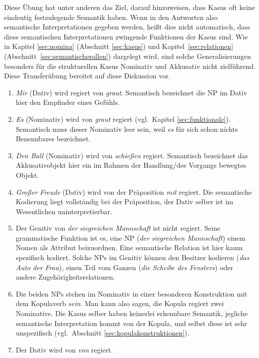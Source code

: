 Diese Übung hat unter anderen das Ziel, darauf hinzuweisen, dass Kasus oft keine eindeutig festzulegende Semantik haben.
Wenn in den Antworten also semantische Interpretationen gegeben werden, heißt dies nicht automatisch, dass diese semantischen Interpretationen zwingende Funktionen der Kasus sind.
Wie in Kapitel \ref{sec:nomina} (Abschnitt \ref{sec:kasus}) und Kapitel~\ref{sec:relationen} (Abschnitt~\ref{sec:semantischerollen}) dargelegt wird, sind solche Generalisierungen besonders für die strukturellen Kasus Nominativ und Akkusativ nicht zielführend.
Diese Transferübung bereitet auf diese Diskussion vor.

\begin{enumerate}\Lf
  \item \textit{Mir} (Dativ) wird regiert von \textit{graut}.
    Semantisch bezeichnet die NP im Dativ hier den Empfinder eines Gefühls.
  \item \textit{Es} (Nominativ) wird von \textit{graut} regiert (vgl.\ Kapitel \ref{sec:funktionale}).
    Semantisch muss dieser Nominativ leer sein, weil \textit{es} für sich schon nichts Benennbares bezeichnet.
  \item \textit{Den Ball} (Nominativ) wird von \textit{schießen} regiert.
    Semantisch bezeichnet das Akkusativobjekt hier ein im Rahmen der Handlung/des Vorgangs bewegtes Objekt.
  \item \label{it:ex-morph-123} \textit{Großer Freude} (Dativ) wird von der Präposition \textit{mit} regiert.
    Die semantische Kodierung liegt vollständig bei der Präposition, der Dativ selber ist im Wesentlichen uninterpretierbar.
  \item Der Genitiv von \textit{der siegreichen Mannschaft} ist nicht regiert.
    Seine grammatische Funktion ist es, eine NP (\textit{der siegreichen Mannschaft}) einem Nomen als Attribut beizuordnen.
    Eine semantische Relation ist hier kaum spezifisch kodiert.
    Solche NPs im Genitiv können den Besitzer kodieren (\textit{das Auto der Frau}), einen Teil vom Ganzen (\textit{die Scheibe des Fensters}) oder andere Zugehörigkeitsrelationen.
  \item Die beiden NPs stehen im Nominativ in einer besonderen Konstruktion mit dem Kopulaverb \textit{sein}.
    Man kann also sagen, die Kopula regiert zwei Nominative.
    Die Kasus selber haben keinerlei erkennbare Semantik, jegliche semantische Interpretation kommt von der Kopula, und selbst diese ist sehr unspezifisch (vgl.\ Abschnitt \ref{sec:kopulakonstruktionen}).
  \item Der Dativ wird von \textit{von} regiert.

\end{enumerate}

